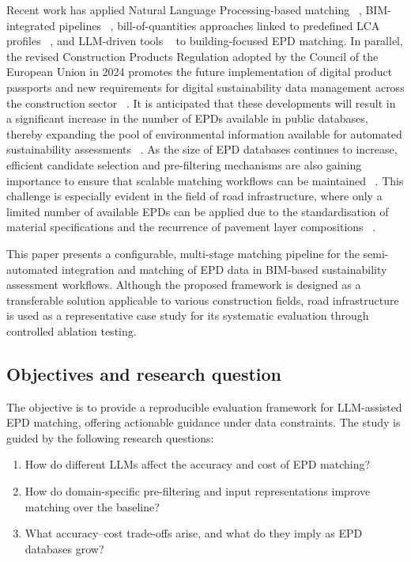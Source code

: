 \documentclass[10pt, a4paper, twocolumn]{article}
\begin{document}
Recent work has applied Natural Language Processing-based matching ~\cite{Forth.2023}, BIM-integrated pipelines ~\cite{Hermann.2024}, bill-of-quantities approaches linked to predefined LCA profiles ~\cite{J.HofmeyerK.ForthS.EsserA.Borrmann.}, and LLM-driven tools ~\cite{Petrosa.2025} to building-focused EPD matching. In parallel, the revised Construction Products Regulation adopted by the Council of the European Union in 2024 promotes the future implementation of digital product passports and new requirements for digital sustainability data management across the construction sector ~\cite{CounciloftheEU.2024}. It is anticipated that these developments will result in a significant increase in the number of EPDs available in public databases, thereby expanding the pool of environmental information available for automated sustainability assessments ~\cite{Construction Products Regulation (EU) 2024/3110}. As the size of EPD databases continues to increase, efficient candidate selection and pre-filtering mechanisms are also gaining importance to ensure that scalable matching workflows can be maintained ~\cite{Petrosa.2025}. This challenge is especially evident in the field of road infrastructure, where only a limited number of available EPDs can be applied due to the standardisation of material specifications and the recurrence of pavement layer compositions ~\cite{ Kaus.2025, Petrosa.2025}. 

This paper presents a configurable, multi-stage matching pipeline for the semi-automated integration and matching of EPD data in BIM-based sustainability assessment workflows. Although the proposed framework is designed as a transferable solution applicable to various construction fields, road infrastructure is used as a representative case study for its systematic evaluation through controlled ablation testing.

\subsection{Objectives and research question}

The objective is to provide a reproducible evaluation framework for LLM-assisted EPD matching, offering actionable guidance under data constraints. The study is guided by the following research questions:

\begin{enumerate}[label=\textbf{RQ\arabic*:}, leftmargin=*, labelsep=0.5em,
                  itemsep=2pt, topsep=3pt]
  \item How do different LLMs affect the accuracy and cost of EPD matching?
  \item How do domain-specific pre-filtering and input representations improve
        matching over the baseline?
  \item What accuracy--cost trade-offs arise, and what do they imply as EPD
        databases grow?
\end{enumerate}
\end{document}
